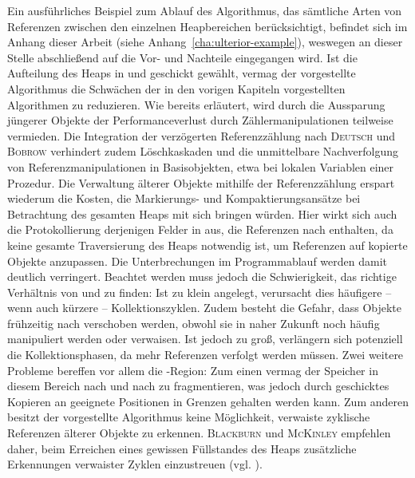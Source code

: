 Ein ausführliches Beispiel zum Ablauf des Algorithmus, das sämtliche Arten von Referenzen zwischen den einzelnen Heapbereichen berücksichtigt, befindet sich im Anhang dieser Arbeit (siehe Anhang~\ref{cha:ulterior-example}), weswegen an dieser Stelle abschließend auf die Vor- und Nachteile eingegangen wird.
Ist die Aufteilung des Heaps in \Nursery und \Mature geschickt gewählt, vermag der vorgestellte Algorithmus die Schwächen der in den vorigen Kapiteln vorgestellten Algorithmen zu reduzieren.
Wie bereits erläutert, wird durch die Aussparung jüngerer Objekte der Performanceverlust durch Zählermanipulationen teilweise vermieden.
Die Integration der verzögerten Referenzzählung nach \textsc{Deutsch} und \textsc{Bobrow} verhindert zudem Löschkaskaden und die unmittelbare Nachverfolgung von Referenzmanipulationen in Basisobjekten, etwa bei lokalen Variablen einer Prozedur.
Die Verwaltung älterer Objekte mithilfe der Referenzzählung erspart wiederum die Kosten, die Markierungs- und Kompaktierungsansätze bei Betrachtung des gesamten Heaps mit sich bringen würden.
Hier wirkt sich auch die Protokollierung derjenigen Felder in \Mature aus, die Referenzen nach \Nursery enthalten, da keine gesamte Traversierung des Heaps notwendig ist, um Referenzen auf kopierte Objekte anzupassen.
Die Unterbrechungen im Programmablauf werden damit deutlich verringert.
Beachtet werden muss jedoch die Schwierigkeit, das richtige Verhältnis von \Nursery und \Mature zu finden:
Ist \Nursery zu klein angelegt, verursacht dies häufigere -- wenn auch kürzere -- Kollektionszyklen.
Zudem besteht die Gefahr, dass Objekte frühzeitig nach \Mature verschoben werden, obwohl sie in naher Zukunft noch häufig manipuliert werden oder verwaisen.
Ist \Nursery jedoch zu groß, verlängern sich potenziell die Kollektionsphasen, da mehr Referenzen verfolgt werden müssen.
Zwei weitere Probleme bereffen vor allem die \Mature-Region:
Zum einen vermag der Speicher in diesem Bereich nach und nach zu fragmentieren, was jedoch durch geschicktes Kopieren an geeignete Positionen in Grenzen gehalten werden kann.
Zum anderen besitzt der vorgestellte Algorithmus keine Möglichkeit, verwaiste zyklische Referenzen älterer Objekte zu erkennen.
\textsc{Blackburn} und \textsc{McKinley} empfehlen daher, beim Erreichen eines gewissen Füllstandes des Heaps zusätzliche Erkennungen verwaister Zyklen einzustreuen (vgl. \cite[S. 349]{blackburn2003}).




